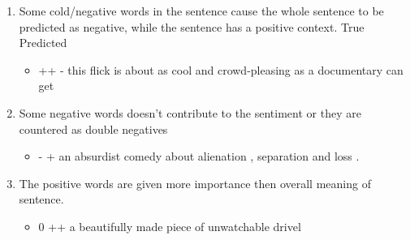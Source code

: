 \documentclass[letter,12pt]{article}
\begin{document}
\begin{enumerate}

\item Some cold/negative words in the sentence cause the whole sentence to be predicted as negative, while the sentence has a positive context.
True   Predicted
\begin{itemize}

 \item ++   -   this flick is about as cool and crowd-pleasing as a documentary can get 
\end{itemize}
\item Some negative words doesn't contribute to the sentiment or they are countered as double negatives
\begin{itemize}
\item -   +   an absurdist comedy about alienation , separation and loss .
\end{itemize}

\item The positive words are given more importance then overall meaning of sentence.
\begin{itemize}

\item 0   ++   a beautifully made piece of unwatchable drivel
\end{itemize}

\end{enumerate}
\end{document}
